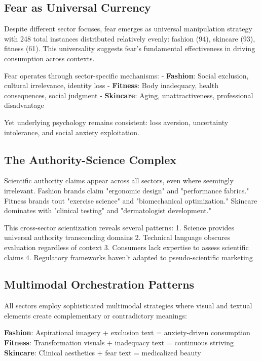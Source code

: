\subsection{Fear as Universal Currency}

Despite different sector focuses, fear emerges as universal manipulation strategy with 248 total instances distributed relatively evenly: fashion (94), skincare (93), fitness (61). This universality suggests fear's fundamental effectiveness in driving consumption across contexts.

Fear operates through sector-specific mechanisms:
- \textbf{Fashion}: Social exclusion, cultural irrelevance, identity loss
- \textbf{Fitness}: Body inadequacy, health consequences, social judgment
- \textbf{Skincare}: Aging, unattractiveness, professional disadvantage

Yet underlying psychology remains consistent: loss aversion, uncertainty intolerance, and social anxiety exploitation.

\subsection{The Authority-Science Complex}

Scientific authority claims appear across all sectors, even where seemingly irrelevant. Fashion brands claim "ergonomic design" and "performance fabrics." Fitness brands tout "exercise science" and "biomechanical optimization." Skincare dominates with "clinical testing" and "dermatologist development."

This cross-sector scientization reveals several patterns:
1. Science provides universal authority transcending domains
2. Technical language obscures evaluation regardless of context
3. Consumers lack expertise to assess scientific claims
4. Regulatory frameworks haven't adapted to pseudo-scientific marketing

\subsection{Multimodal Orchestration Patterns}

All sectors employ sophisticated multimodal strategies where visual and textual elements create complementary or contradictory meanings:

\textbf{Fashion}: Aspirational imagery + exclusion text = anxiety-driven consumption
\textbf{Fitness}: Transformation visuals + inadequacy text = continuous striving
\textbf{Skincare}: Clinical aesthetics + fear text = medicalized beauty

